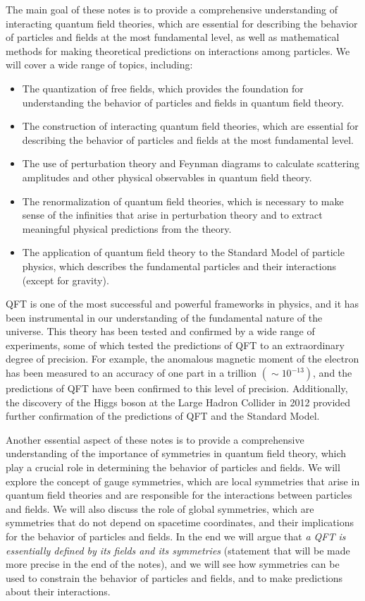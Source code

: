 The main goal of these notes is to provide a comprehensive understanding of interacting quantum field theories, which are essential for describing the behavior of particles and fields at the most fundamental level, as well as mathematical methods for making theoretical predictions on interactions among particles. We will cover a wide range of topics, including:
\begin{itemize}
    \item The quantization of free fields, which provides the foundation for understanding the behavior of particles and fields in quantum field theory.
    \item The construction of interacting quantum field theories, which are essential for describing the behavior of particles and fields at the most fundamental level.
    \item The use of perturbation theory and Feynman diagrams to calculate scattering amplitudes and other physical observables in quantum field theory.
    \item The renormalization of quantum field theories, which is necessary to make sense of the infinities that arise in perturbation theory and to extract meaningful physical predictions from the theory.
    \item The application of quantum field theory to the Standard Model of particle physics, which describes the fundamental particles and their interactions (except for gravity).
\end{itemize}

QFT is one of the most successful and powerful frameworks in physics, and it has been instrumental in our understanding of the fundamental nature of the universe. This theory has been tested and confirmed by a wide range of experiments, some of which tested the predictions of QFT to an extraordinary degree of precision. For example, the anomalous magnetic moment of the electron has been measured to an accuracy of one part in a trillion \((\sim 10^{-13})\), and the predictions of QFT have been confirmed to this level of precision. Additionally, the discovery of the Higgs boson at the Large Hadron Collider in 2012 provided further confirmation of the predictions of QFT and the Standard Model.

Another essential aspect of these notes is to provide a comprehensive understanding of the importance of symmetries in quantum field theory, which play a crucial role in determining the behavior of particles and fields. We will explore the concept of gauge symmetries, which are local symmetries that arise in quantum field theories and are responsible for the interactions between particles and fields. We will also discuss the role of global symmetries, which are symmetries that do not depend on spacetime coordinates, and their implications for the behavior of particles and fields. In the end we will argue that \textit{a QFT is essentially defined by its fields and its symmetries} (statement that will be made more precise in the end of the notes), and we will see how symmetries can be used to constrain the behavior of particles and fields, and to make predictions about their interactions.

